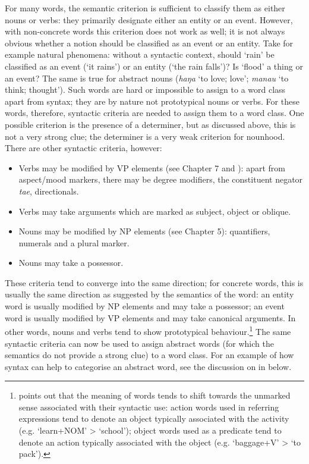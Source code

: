 For many words, the semantic criterion is sufficient to classify them as either nouns or verbs: they primarily designate either an entity or an event. However, with non-concrete words this criterion does not work as well; it is not always obvious whether a notion should be classified as an event or an entity. Take for example natural phenomena: without a syntactic context, should ‘rain’ be classified as an event (‘it rains’) or an entity (‘the rain falls’)? Is ‘flood’ a thing or an event? The same is true for abstract nouns (\textit{haŋa} ‘to love; love’; \textit{mana{\ꞌ}u} ‘to think; thought’). Such words are hard or impossible to assign to a word class apart from syntax; they are by nature not prototypical nouns or verbs. For these words, therefore, syntactic criteria are needed to assign them to a word class. One possible criterion is the presence of a determiner, but as discussed above, this is not a very strong clue; the determiner is a very weak criterion for nounhood. There are other syntactic criteria, however:

\begin{itemize}
\item 
Verbs may be modified by VP elements (see Chapter 7 and ): apart from aspect/mood markers, there may be degree modifiers, the constituent negator \textit{ta{\ꞌ}e}, directionals.

\item 
Verbs may take arguments which are marked as subject, object or oblique.

\item 
Nouns may be modified by NP elements (see Chapter 5): quantifiers, numerals and a plural marker.

\item 
Nouns may take a possessor.

\end{itemize}

These criteria tend to converge into the same direction; for concrete words, this is usually the same direction as suggested by the semantics of the word: an entity word is usually modified by NP elements and may take a possessor; an event word is usually modified by VP elements and may take canonical arguments. In other words, nouns and verbs tend to show prototypical behaviour.\footnote{\label{fn:97}\citet[96]{Croft2000} points out that the meaning of words tends to shift towards the unmarked sense associated with their syntactic use: action words used in referring expressions tend to denote an object typically associated with the activity (e.g. ‘learn+NOM’ {\textgreater} ‘school’); object words used as a predicate tend to denote an action typically associated with the object (e.g. ‘baggage+V’ {\textgreater} ‘to pack’).} The same syntactic criteria can now be used to assign abstract words (for which the semantics do not provide a strong clue) to a word class. For an example of how syntax can help to categorise an abstract word, see the discussion on  in  below.

